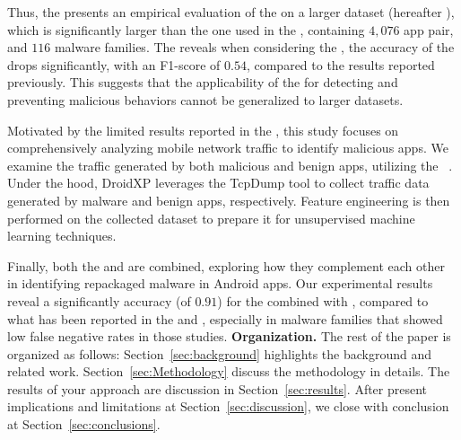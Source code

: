 Thus, the \fhc presents an empirical evaluation of the \mas on a larger dataset (hereafter \cds), which is significantly larger than the one used in the \blls, containing $4,076$ app pair, and $116$ malware families. The \fhc reveals when considering the \cds, the accuracy of the \mas drops significantly, with an F1-score of $0.54$, compared to the results reported previously. This suggests that the applicability of the \mas for detecting and preventing malicious behaviors cannot be generalized to larger datasets.


Motivated by the limited results reported in the \fhc, this study focuses on comprehensively analyzing mobile network traffic to identify malicious apps. We examine the traffic generated by both malicious and benign apps, utilizing the \droidxp~\cite{DBLP:conf/scam/CostaMCMVBC20}. Under the hood, DroidXP leverages the TcpDump tool to collect traffic data generated by malware and benign apps, respectively. Feature engineering is then performed on the collected dataset to prepare it for unsupervised machine learning techniques.

Finally, both the \mas and \net are combined, exploring how they complement each other in identifying repackaged malware in Android apps. Our experimental results reveal a significantly accuracy (\fone of $0.91$) for the \mas combined with \net, compared to what has been reported in the \fhc and \blls, especially in malware families that showed low false negative rates in those studies.\newline\newline
\textbf{Organization.} The rest of the paper is organized as follows: Section~\ref{sec:background} highlights the background and related work. Section~\ref{sec:Methodology} discuss the methodology in details. The results of your approach are discussion in Section~\ref{sec:results}. After present implications and limitations at Section~\ref{sec:discussion}, we close with conclusion at Section~\ref{sec:conclusions}.


